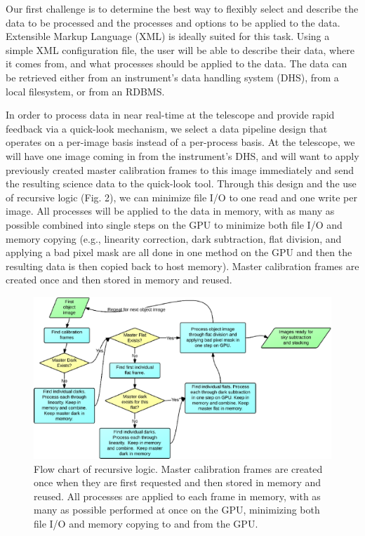 Our first challenge is to determine the best way to flexibly select and describe the data to be processed and the processes and options to be applied to the data.  Extensible Markup Language (XML) is ideally suited for this task.  Using a simple XML configuration file, the user will be able to describe their data, where it comes from, and what processes should be applied to the data.  The data can be retrieved either from an instrument's data handling system (DHS), from a local filesystem, or from an RDBMS.
 
In order to process data in near real-time at the telescope and provide rapid feedback via a quick-look mechanism, we select a data pipeline design that operates on a per-image basis instead of a per-process basis.  At the telescope, we will have one image coming in from the instrument's DHS, and will want to apply previously created master calibration frames to this image immediately and send the resulting science data to the quick-look tool. Through this design and the use of recursive logic (Fig. 2), we can minimize file I/O to one read and one write per image.  All processes will be applied to the data in memory, with as many as possible combined into single steps on the GPU to minimize both file I/O and memory copying (e.g., linearity correction, dark subtraction, flat division, and applying a bad pixel mask are all done in one method on the GPU and then the resulting data is then copied back to host memory).  Master calibration frames are created once and then stored in memory and reused.

\begin{figure}[!ht]
\includegraphics{part4/Warner_O31/O31_f2.eps}

\caption{Flow chart of recursive logic.  Master calibration frames are created once when they are first requested and then stored in memory and reused. All processes are applied to each frame in memory, with as many as possible performed at once on the GPU, minimizing both file I/O and memory copying to and from the GPU. }

\end{figure}


